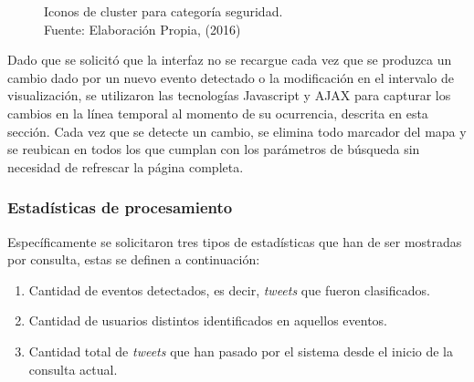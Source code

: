 \begin{figure}[H]
\centering
{}\hfill
{}\hfill
{}
\caption[Iconos de cluster para categoría seguridad.]{Iconos de cluster para categoría seguridad.\\Fuente: Elaboración Propia, (2016)}
\label{fig:clusterseguridad}
\end{figure}

Dado que se solicitó que la interfaz no se recargue cada vez que se produzca un cambio dado por un nuevo evento detectado o la modificación en el intervalo de visualización, se utilizaron las tecnologías Javascript y AJAX para capturar los cambios en la línea temporal al momento de su ocurrencia, descrita en esta sección. Cada vez que se detecte un cambio, se elimina todo marcador del mapa y se reubican en todos los que cumplan con los parámetros de búsqueda sin necesidad de refrescar la página completa.

\subsubsection*{Estadísticas de procesamiento}
\label{subsubsec:estadisticasdeproc}

Específicamente se solicitaron tres tipos de estadísticas que han de ser mostradas por consulta, estas se definen a continuación:

\begin{enumerate}
\item Cantidad de eventos detectados, es decir, \textit{tweets} que fueron clasificados.
\item Cantidad de usuarios distintos identificados en aquellos eventos.
\item Cantidad total de \textit{tweets} que han pasado por el sistema desde el inicio de la consulta actual.
\end{enumerate}

